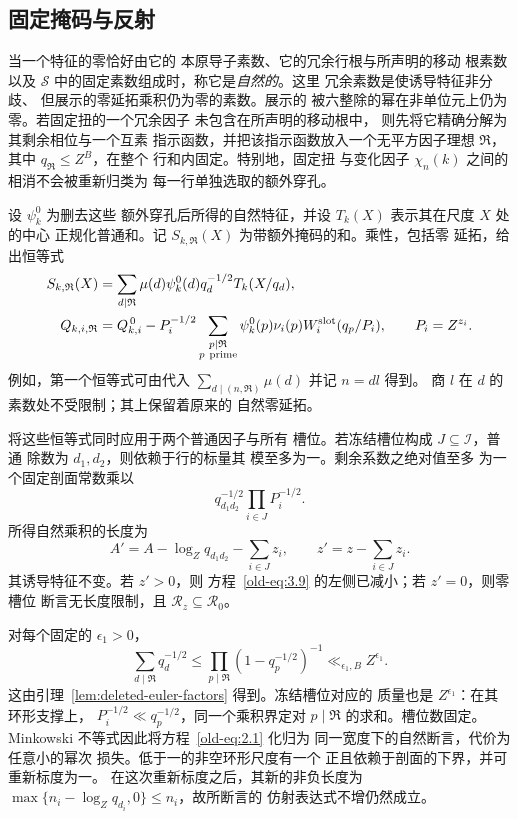 \subsection{固定掩码与反射}

当一个特征的零恰好由它的
本原导子素数、它的冗余行根与所声明的移动
根素数以及 \(\mathcal S\) 中的固定素数组成时，称它是\emph{自然的}。这里
冗余素数是使诱导特征非分歧、
但展示的零延拓乘积仍为零的素数。展示的
被六整除的幂在非单位元上仍为零。若固定扭的一个冗余因子
未包含在所声明的移动根中，
则先将它精确分解为其剩余相位与一个互素
指示函数，并把该指示函数放入一个无平方因子理想
\(\mathfrak R\)，其中 \(q_{\mathfrak R}\le Z^B\)，在整个
行和内固定。特别地，固定扭
与变化因子 \(\chi_n(k)\) 之间的相消不会被重新归类为
每一行单独选取的额外穿孔。

设 \(\psi_k^0\) 为删去这些
额外穿孔后所得的自然特征，并设 \(T_k(X)\) 表示其在尺度 \(X\) 处的中心
正规化普通和。记 \(S_{k,\mathfrak R}(X)\)
为带额外掩码的和。乘性，包括零
延拓，给出恒等式
\begin{align}
 S_{k,\mathfrak R}(X)
 &=\sum_{d\mid\mathfrak R}\mu(d)\psi_k^0(d)q_d^{-1/2}
                  T_k(X/q_d),
 \label{old-eq:2.1a}\\
 Q_{k,i,\mathfrak R}
 &=Q_{k,i}^{\,0}
   -P_i^{-1/2}\sum_{\substack{p\mid\mathfrak R\\p\ {\rm prime}}}
       \psi_k^0(p)\nu_i(p)W_i^{\rm slot}(q_p/P_i),
 \qquad P_i=Z^{z_i}.
 \label{eq:prime-mask-erasure}
\end{align}
例如，第一个恒等式可由代入
\(\sum_{d\mid(n,\mathfrak R)}\mu(d)\) 并记 \(n=dl\) 得到。
商 \(l\) 在 \(d\) 的素数处不受限制；其上保留着原来的
自然零延拓。

将这些恒等式同时应用于两个普通因子与所有
槽位。若冻结槽位构成 \(J\subseteq\mathcal I\)，普通
除数为 \(d_1,d_2\)，则依赖于行的标量其
模至多为一。剩余系数之绝对值至多
为一个固定剖面常数乘以
\[
 q_{d_1d_2}^{-1/2}\prod_{i\in J}P_i^{-1/2}.
\]
所得自然乘积的长度为
\[
 A'=A-\log_Zq_{d_1d_2}-\sum_{i\in J}z_i,\qquad
 z'=z-\sum_{i\in J}z_i.
\]
其诱导特征不变。若 \(z'>0\)，则
方程~\eqref{old-eq:3.9} 的左侧已减小；若 \(z'=0\)，则零槽位
断言无长度限制，且
\(\mathcal R_z\subseteq\mathcal R_0\)。

对每个固定的 \(\epsilon_1>0\)，
\begin{equation}
 \sum_{d\mid\mathfrak R}q_d^{-1/2}
 \le \prod_{p\mid\mathfrak R}(1-q_p^{-1/2})^{-1}
 \ll_{\epsilon_1,B} Z^{\epsilon_1}.
 \label{old-eq:2.1b}
\end{equation}
这由引理~\ref{lem:deleted-euler-factors} 得到。冻结槽位对应的
质量也是 \(Z^{\epsilon_1}\)：在其环形支撑上，
\(P_i^{-1/2}\ll q_p^{-1/2}\)，同一个乘积界定对
\(p\mid\mathfrak R\) 的求和。槽位数固定。Minkowski
不等式因此将方程~\eqref{old-eq:2.1} 化归为
同一宽度下的自然断言，代价为任意小的幂次
损失。低于一的非空环形尺度有一个
正且依赖于剖面的下界，并可重新标度为一。
在这次重新标度之后，其新的非负长度为
\(\max\{n_i-\log_Zq_{d_i},0\}\le n_i\)，故所断言的
仿射表达式不增仍然成立。

